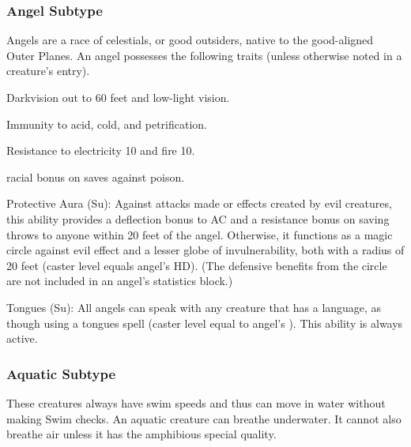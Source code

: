 \subsubsection{Angel Subtype} Angels are a race of celestials, or good outsiders, native to the good-aligned Outer Planes.
 An angel possesses the following traits (unless otherwise noted in a creature's entry).
\begin{itemize*}
\item Darkvision out to 60 feet and low-light vision.
\item Immunity to acid, cold, and petrification.
\item Resistance to electricity 10 and fire 10.
\item {} racial bonus on saves against poison.
\item Protective Aura (Su): Against attacks made or effects created by evil creatures, this ability provides a  deflection bonus to AC and a  resistance bonus on saving throws to anyone within 20 feet of the angel. Otherwise, it functions as a magic circle against evil effect and a lesser globe of invulnerability, both with a radius of 20 feet (caster level equals angel's HD). (The defensive benefits from the circle are not included in an angel's statistics block.) 
\item Tongues (Su): All angels can speak with any creature that has a language, as though using a tongues spell (caster level equal to angel's ). This ability is always active.
\end{itemize*}

\subsubsection{Aquatic Subtype} These creatures always have swim speeds and thus can move in water without making Swim checks. An aquatic creature can breathe underwater. It cannot also breathe air unless it has the amphibious special quality. 


